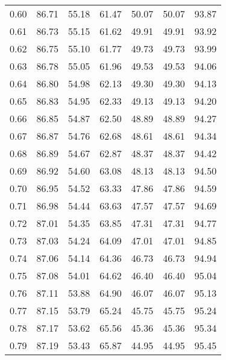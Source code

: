 \begin{tabular}{|c|c|c|c|c|c|c|}
      0.60 &     86.71 &     55.18 &      61.47 &   50.07 &      50.07 &         93.87 \\
      0.61 &     86.73 &     55.15 &      61.62 &   49.91 &      49.91 &         93.92 \\
      0.62 &     86.75 &     55.10 &      61.77 &   49.73 &      49.73 &         93.99 \\
      0.63 &     86.78 &     55.05 &      61.96 &   49.53 &      49.53 &         94.06 \\
      0.64 &     86.80 &     54.98 &      62.13 &   49.30 &      49.30 &         94.13 \\
      0.65 &     86.83 &     54.95 &      62.33 &   49.13 &      49.13 &         94.20 \\
      0.66 &     86.85 &     54.87 &      62.50 &   48.89 &      48.89 &         94.27 \\
      0.67 &     86.87 &     54.76 &      62.68 &   48.61 &      48.61 &         94.34 \\
      0.68 &     86.89 &     54.67 &      62.87 &   48.37 &      48.37 &         94.42 \\
      0.69 &     86.92 &     54.60 &      63.08 &   48.13 &      48.13 &         94.50 \\
      0.70 &     86.95 &     54.52 &      63.33 &   47.86 &      47.86 &         94.59 \\
      0.71 &     86.98 &     54.44 &      63.63 &   47.57 &      47.57 &         94.69 \\
      0.72 &     87.01 &     54.35 &      63.85 &   47.31 &      47.31 &         94.77 \\
      0.73 &     87.03 &     54.24 &      64.09 &   47.01 &      47.01 &         94.85 \\
      0.74 &     87.06 &     54.14 &      64.36 &   46.73 &      46.73 &         94.94 \\
      0.75 &     87.08 &     54.01 &      64.62 &   46.40 &      46.40 &         95.04 \\
      0.76 &     87.11 &     53.88 &      64.90 &   46.07 &      46.07 &         95.13 \\
      0.77 &     87.15 &     53.79 &      65.24 &   45.75 &      45.75 &         95.24 \\
      0.78 &     87.17 &     53.62 &      65.56 &   45.36 &      45.36 &         95.34 \\
      0.79 &     87.19 &     53.43 &      65.87 &   44.95 &      44.95 &         95.45 \\

\end{tabular}
